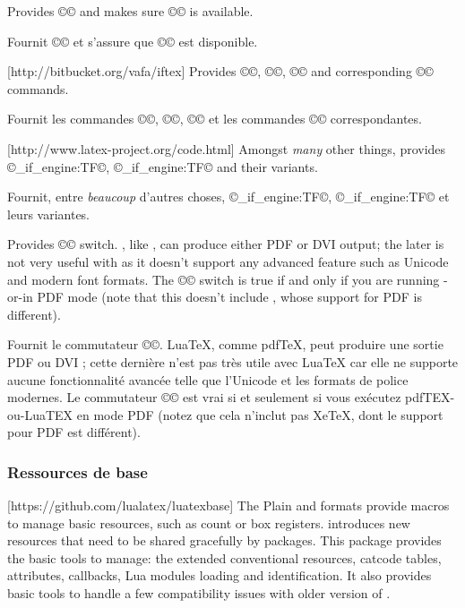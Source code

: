 \documentclass{lltxdoc}
\begin{document}
Provides ©\ifluatex© and makes sure ©\luatexversion© is available.

Fournit ©\ifluatex© et s'assure que ©\luatexversion© est disponible.

[http://bitbucket.org/vafa/iftex]
Provides ©\ifPDFTeX©, ©\ifXeTeX©, ©\ifLuaTeX© and corresponding ©\Require©
commands.

Fournit les commandes ©\ifPDFTeX©, ©\ifXeTeX©, ©\ifLuaTeX© et les commandes ©\Require© correspondantes.

[http://www.latex-project.org/code.html]
Amongst \emph{many} other things, provides ©\luatex_if_engine:TF©,
©\xetex_if_engine:TF© and their variants.

Fournit, entre \emph{beaucoup} d'autres choses, ©\luatex_if_engine:TF©, ©\xetex_if_engine:TF© et leurs variantes.

Provides ©\ifpdf© switch. \luatex, like \pdftex, can produce either PDF or DVI
output; the later is not very useful with \luatex as it doesn't support any
advanced feature such as Unicode and modern font formats. The ©\ifpdf© switch
is true if and only if you are running \pdftex-or-\luatex in PDF mode (note
that this doesn't include \xetex, whose support for PDF is different).

Fournit le commutateur ©\ifpdf©. LuaTeX, comme pdfTeX, peut produire une sortie PDF ou DVI ; cette dernière n'est pas très utile avec LuaTeX car elle ne supporte aucune fonctionnalité avancée telle que l'Unicode et les formats de police modernes. Le commutateur ©\ifpdf© est vrai si et seulement si vous exécutez pdfTEX-ou-LuaTEX en mode PDF (notez que cela n'inclut pas XeTeX, dont le support pour PDF est différent).

\subsubsection{Ressources de base}

[https://github.com/lualatex/luatexbase]
The Plain and \latex formats provide macros to manage \tex basic resources,
such as count or box registers. \luatex introduces new resources that need to
be shared gracefully by packages. This package provides the basic tools to
manage: the extended conventional \tex resources, catcode tables, attributes,
callbacks, Lua modules loading and identification. It also provides basic
tools to handle a few compatibility issues with older version of \luatex.
\end{document}
